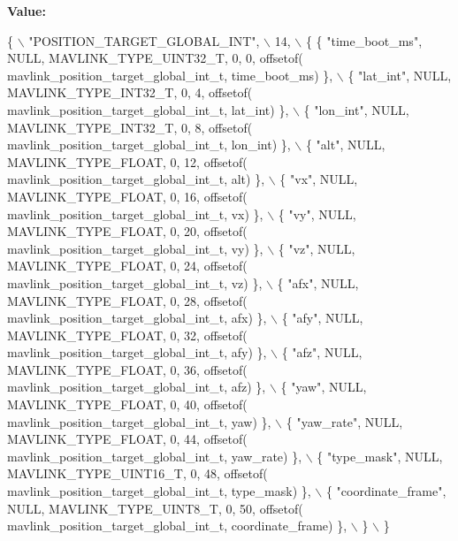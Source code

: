 {\bfseries Value\+:}
\begin{DoxyCode}
\{ \(\backslash\)
    \textcolor{stringliteral}{"POSITION\_TARGET\_GLOBAL\_INT"}, \(\backslash\)
    14, \(\backslash\)
    \{  \{ \textcolor{stringliteral}{"time\_boot\_ms"}, NULL, MAVLINK_TYPE_UINT32_T, 0, 0, offsetof(
      mavlink_position_target_global_int_t, time\_boot\_ms) \}, \(\backslash\)
         \{ \textcolor{stringliteral}{"lat\_int"}, NULL, MAVLINK_TYPE_INT32_T, 0, 4, offsetof(
      mavlink_position_target_global_int_t, lat\_int) \}, \(\backslash\)
         \{ \textcolor{stringliteral}{"lon\_int"}, NULL, MAVLINK_TYPE_INT32_T, 0, 8, offsetof(
      mavlink_position_target_global_int_t, lon\_int) \}, \(\backslash\)
         \{ \textcolor{stringliteral}{"alt"}, NULL, MAVLINK_TYPE_FLOAT, 0, 12, offsetof(
      mavlink_position_target_global_int_t, alt) \}, \(\backslash\)
         \{ \textcolor{stringliteral}{"vx"}, NULL, MAVLINK_TYPE_FLOAT, 0, 16, offsetof(
      mavlink_position_target_global_int_t, vx) \}, \(\backslash\)
         \{ \textcolor{stringliteral}{"vy"}, NULL, MAVLINK_TYPE_FLOAT, 0, 20, offsetof(
      mavlink_position_target_global_int_t, vy) \}, \(\backslash\)
         \{ \textcolor{stringliteral}{"vz"}, NULL, MAVLINK_TYPE_FLOAT, 0, 24, offsetof(
      mavlink_position_target_global_int_t, vz) \}, \(\backslash\)
         \{ \textcolor{stringliteral}{"afx"}, NULL, MAVLINK_TYPE_FLOAT, 0, 28, offsetof(
      mavlink_position_target_global_int_t, afx) \}, \(\backslash\)
         \{ \textcolor{stringliteral}{"afy"}, NULL, MAVLINK_TYPE_FLOAT, 0, 32, offsetof(
      mavlink_position_target_global_int_t, afy) \}, \(\backslash\)
         \{ \textcolor{stringliteral}{"afz"}, NULL, MAVLINK_TYPE_FLOAT, 0, 36, offsetof(
      mavlink_position_target_global_int_t, afz) \}, \(\backslash\)
         \{ \textcolor{stringliteral}{"yaw"}, NULL, MAVLINK_TYPE_FLOAT, 0, 40, offsetof(
      mavlink_position_target_global_int_t, yaw) \}, \(\backslash\)
         \{ \textcolor{stringliteral}{"yaw\_rate"}, NULL, MAVLINK_TYPE_FLOAT, 0, 44, offsetof(
      mavlink_position_target_global_int_t, yaw\_rate) \}, \(\backslash\)
         \{ \textcolor{stringliteral}{"type\_mask"}, NULL, MAVLINK_TYPE_UINT16_T, 0, 48, offsetof(
      mavlink_position_target_global_int_t, type\_mask) \}, \(\backslash\)
         \{ \textcolor{stringliteral}{"coordinate\_frame"}, NULL, MAVLINK_TYPE_UINT8_T, 0, 50, offsetof(
      mavlink_position_target_global_int_t, coordinate\_frame) \}, \(\backslash\)
         \} \(\backslash\)
\}
\end{DoxyCode}
\mbox{\label{mavlink__msg__position__target__global__int_8h_a1d6a754b2d82340cb7ab3aab2f5c13fc}} 
